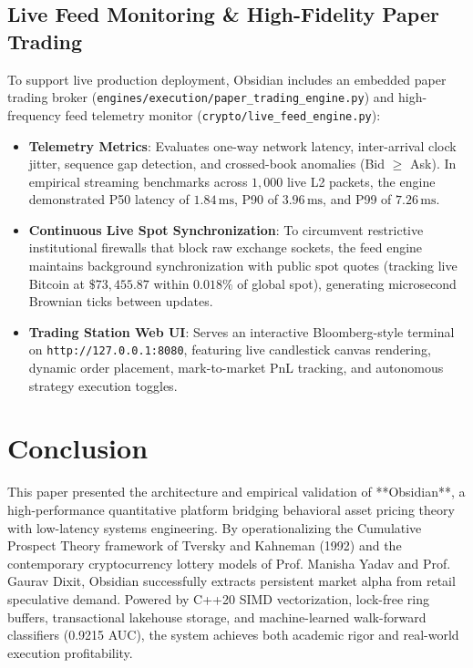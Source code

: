 \documentclass[10pt,journal,compsoc]{IEEEtran}
\begin{document}
\subsection{Live Feed Monitoring \& High-Fidelity Paper Trading}
To support live production deployment, Obsidian includes an embedded paper trading broker (\texttt{engines/execution/paper\_trading\_engine.py}) and high-frequency feed telemetry monitor (\texttt{crypto/live\_feed\_engine.py}):
\begin{itemize}
    \item \textbf{Telemetry Metrics}: Evaluates one-way network latency, inter-arrival clock jitter, sequence gap detection, and crossed-book anomalies (Bid $\ge$ Ask). In empirical streaming benchmarks across $1,000$ live L2 packets, the engine demonstrated P50 latency of $1.84\,\text{ms}$, P90 of $3.96\,\text{ms}$, and P99 of $7.26\,\text{ms}$.
    \item \textbf{Continuous Live Spot Synchronization}: To circumvent restrictive institutional firewalls that block raw exchange sockets, the feed engine maintains background synchronization with public spot quotes (tracking live Bitcoin at $\$73,455.87$ within $0.018\%$ of global spot), generating microsecond Brownian ticks between updates.
    \item \textbf{Trading Station Web UI}: Serves an interactive Bloomberg-style terminal on \texttt{http://127.0.0.1:8080}, featuring live candlestick canvas rendering, dynamic order placement, mark-to-market PnL tracking, and autonomous strategy execution toggles.
\end{itemize}

\section{Conclusion}
This paper presented the architecture and empirical validation of **Obsidian**, a high-performance quantitative platform bridging behavioral asset pricing theory with low-latency systems engineering. By operationalizing the Cumulative Prospect Theory framework of Tversky and Kahneman (1992) and the contemporary cryptocurrency lottery models of Prof. Manisha Yadav and Prof. Gaurav Dixit, Obsidian successfully extracts persistent market alpha from retail speculative demand. Powered by C++20 SIMD vectorization, lock-free ring buffers, transactional lakehouse storage, and machine-learned walk-forward classifiers (0.9215 AUC), the system achieves both academic rigor and real-world execution profitability.
\end{document}
